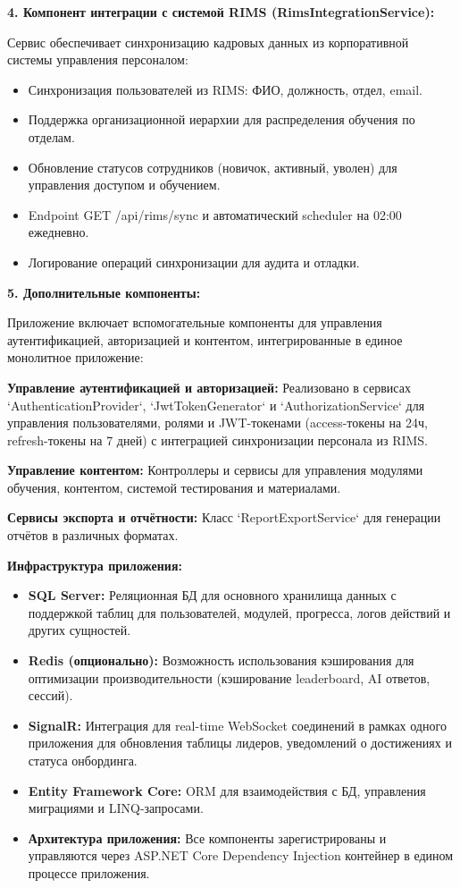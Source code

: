 \textbf{4. Компонент интеграции с системой RIMS (RimsIntegrationService):}

Сервис обеспечивает синхронизацию кадровых данных из корпоративной системы управления персоналом:
\begin{itemize}
	\item Синхронизация пользователей из RIMS: ФИО, должность, отдел, email.
	\item Поддержка организационной иерархии для распределения обучения по отделам.
	\item Обновление статусов сотрудников (новичок, активный, уволен) для управления доступом и обучением.
	\item Endpoint GET /api/rims/sync и автоматический scheduler на 02:00 ежедневно.
	\item Логирование операций синхронизации для аудита и отладки.
\end{itemize}

\textbf{5. Дополнительные компоненты:}

Приложение включает вспомогательные компоненты для управления аутентификацией, авторизацией и контентом, интегрированные в единое монолитное приложение:

\textbf{Управление аутентификацией и авторизацией:} Реализовано в сервисах `AuthenticationProvider`, `JwtTokenGenerator` и `AuthorizationService` для управления пользователями, ролями и JWT-токенами (access-токены на 24ч, refresh-токены на 7 дней) с интеграцией синхронизации персонала из RIMS.

\textbf{Управление контентом:} Контроллеры и сервисы для управления модулями обучения, контентом, системой тестирования и материалами.

\textbf{Сервисы экспорта и отчётности:} Класс `ReportExportService` для генерации отчётов в различных форматах.

\textbf{Инфраструктура приложения:}
\begin{itemize}
	\item \textbf{SQL Server:} Реляционная БД для основного хранилища данных с поддержкой таблиц для пользователей, модулей, прогресса, логов действий и других сущностей.
	\item \textbf{Redis (опционально):} Возможность использования кэширования для оптимизации производительности (кэширование leaderboard, AI ответов, сессий).
	\item \textbf{SignalR:} Интеграция для real-time WebSocket соединений в рамках одного приложения для обновления таблицы лидеров, уведомлений о достижениях и статуса онбординга.
	\item \textbf{Entity Framework Core:} ORM для взаимодействия с БД, управления миграциями и LINQ-запросами.
	\item \textbf{Архитектура приложения:} Все компоненты зарегистрированы и управляются через ASP.NET Core Dependency Injection контейнер в едином процессе приложения.
\end{itemize}

